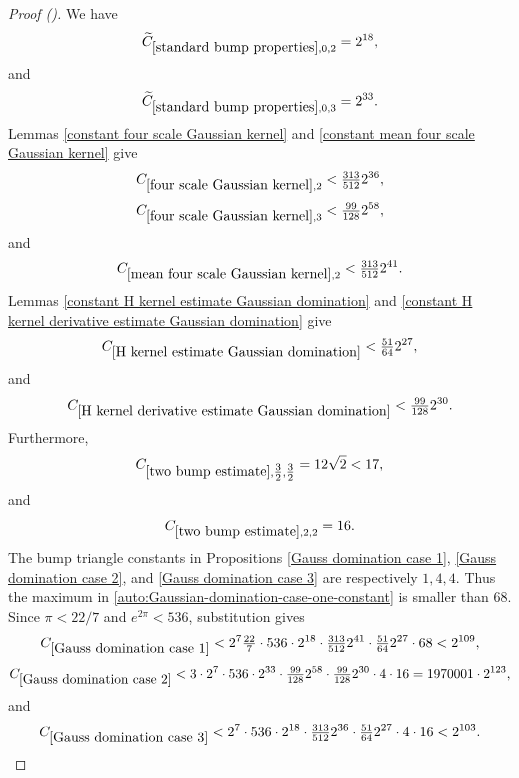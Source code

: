 \documentclass[12pt,reqno]{amsart}
\newcommand{\auto}{{({\tiny\faCar})}}
\theoremstyle{plain}
\numberwithin{equation}{section}
\theoremstyle{remark}
\begin{document}
\begin{proof}[Proof \auto]
We have
\begin{equation}\label{auto:standard-bump-small-constants-for-Gaussian-domination}
\widetilde C_{\ref{standard bump properties},0,2}=2^{18},
\end{equation}
and
\begin{equation}\label{auto:standard-bump-small-constant-three-for-Gaussian-domination}
\widetilde C_{\ref{standard bump properties},0,3}=2^{33}.
\end{equation}
Lemmas \ref{constant four scale Gaussian kernel} and \ref{constant mean four scale Gaussian kernel} give
\begin{equation}\label{auto:four-scale-small-constant-two-for-Gaussian-domination}
C_{\ref{four scale Gaussian kernel},2}<\tfrac{313}{512}2^{36},
\end{equation}
\begin{equation}\label{auto:four-scale-small-constant-three-for-Gaussian-domination}
C_{\ref{four scale Gaussian kernel},3}<\tfrac{99}{128}2^{58},
\end{equation}
and
\begin{equation}\label{auto:mean-four-scale-small-constant-two-for-Gaussian-domination}
C_{\ref{mean four scale Gaussian kernel},2}<\tfrac{313}{512}2^{41}.
\end{equation}
Lemmas \ref{constant H kernel estimate Gaussian domination} and \ref{constant H kernel derivative estimate Gaussian domination} give
\begin{equation}\label{auto:H-kernel-small-constant-for-Gaussian-domination}
C_{\ref{H kernel estimate Gaussian domination}}<\tfrac{51}{64}2^{27},
\end{equation}
and
\begin{equation}\label{auto:H-kernel-derivative-small-constant-for-Gaussian-domination}
C_{\ref{H kernel derivative estimate Gaussian domination}}<\tfrac{99}{128}2^{30}.
\end{equation}
Furthermore,
\begin{equation}\label{auto:two-bump-small-constant-three-halves-for-Gaussian-domination}
C_{\ref{two bump estimate},\tfrac32,\tfrac32}=12\sqrt2<17,
\end{equation}
and
\begin{equation}\label{auto:two-bump-small-constant-two-for-Gaussian-domination}
C_{\ref{two bump estimate},2,2}=16.
\end{equation}
The bump triangle constants in Propositions \ref{Gauss domination case 1}, \ref{Gauss domination case 2}, and \ref{Gauss domination case 3} are respectively $1,4,4$. Thus the maximum in \eqref{auto:Gaussian-domination-case-one-constant} is smaller than $68$. Since $\pi<22/7$ and $e^{2\pi}<536$, substitution gives
\[
C_{\ref{Gauss domination case 1}}
<2^7\tfrac{22}{7}\cdot536\cdot2^{18}
\cdot\tfrac{313}{512}2^{41}
\cdot\tfrac{51}{64}2^{27}\cdot68
<2^{109},
\]
\[
C_{\ref{Gauss domination case 2}}
<3\cdot2^7\cdot536\cdot2^{33}
\cdot\tfrac{99}{128}2^{58}
\cdot\tfrac{99}{128}2^{30}\cdot4\cdot16
=1970001\cdot2^{123},
\]
and
\[
C_{\ref{Gauss domination case 3}}
<2^7\cdot536\cdot2^{18}
\cdot\tfrac{313}{512}2^{36}
\cdot\tfrac{51}{64}2^{27}\cdot4\cdot16
<2^{103}.
\]
\end{proof}
\end{document}
